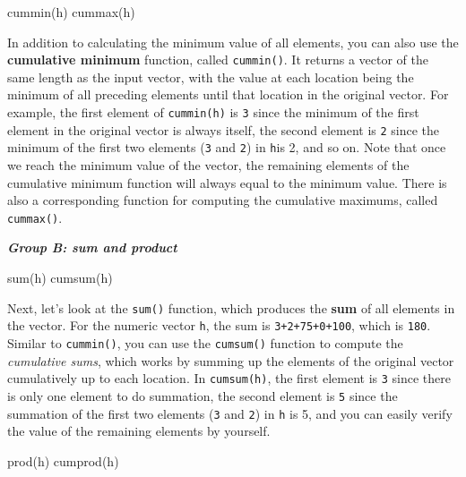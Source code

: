 \documentclass[
]{book}
\newenvironment{Shaded}{\begin{snugshade}}{\end{snugshade}}
\newcommand{\FunctionTok}[1]{\textcolor[rgb]{0.00,0.00,0.00}{#1}}
\newcommand{\NormalTok}[1]{#1}
\begin{document}
\begin{Shaded}
\begin{Highlighting}[]
\FunctionTok{cummin}\NormalTok{(h) }
\FunctionTok{cummax}\NormalTok{(h) }
\end{Highlighting}
\end{Shaded}

In addition to calculating the minimum value of all elements, you can also use the \textbf{cumulative minimum} function, called \texttt{cummin()}. It returns a vector of the same length as the input vector, with the value at each location being the minimum of all preceding elements until that location in the original vector. For example, the first element of \texttt{cummin(h)} is \texttt{3} since the minimum of the first element in the original vector is always itself, the second element is \texttt{2} since the minimum of the first two elements (\texttt{3} and \texttt{2}) in \texttt{h}is 2, and so on. Note that once we reach the minimum value of the vector, the remaining elements of the cumulative minimum function will always equal to the minimum value. There is also a corresponding function for computing the cumulative maximums, called \texttt{cummax()}.

\textbf{\emph{Group B: sum and product}}

\begin{Shaded}
\begin{Highlighting}[]
\FunctionTok{sum}\NormalTok{(h)}
\FunctionTok{cumsum}\NormalTok{(h)}
\end{Highlighting}
\end{Shaded}

Next, let's look at the \texttt{sum()} function, which produces the \textbf{sum} of all elements in the vector. For the numeric vector \texttt{h}, the sum is \texttt{3+2+75+0+100}, which is \texttt{180}. Similar to \texttt{cummin()}, you can use the \texttt{cumsum()} function to compute the \emph{cumulative sums}, which works by summing up the elements of the original vector cumulatively up to each location. In \texttt{cumsum(h)}, the first element is \texttt{3} since there is only one element to do summation, the second element is \texttt{5} since the summation of the first two elements (\texttt{3} and \texttt{2}) in \texttt{h} is 5, and you can easily verify the value of the remaining elements by yourself.

\begin{Shaded}
\begin{Highlighting}[]
\FunctionTok{prod}\NormalTok{(h)}
\FunctionTok{cumprod}\NormalTok{(h)}
\end{Highlighting}
\end{Shaded}
\end{document}

